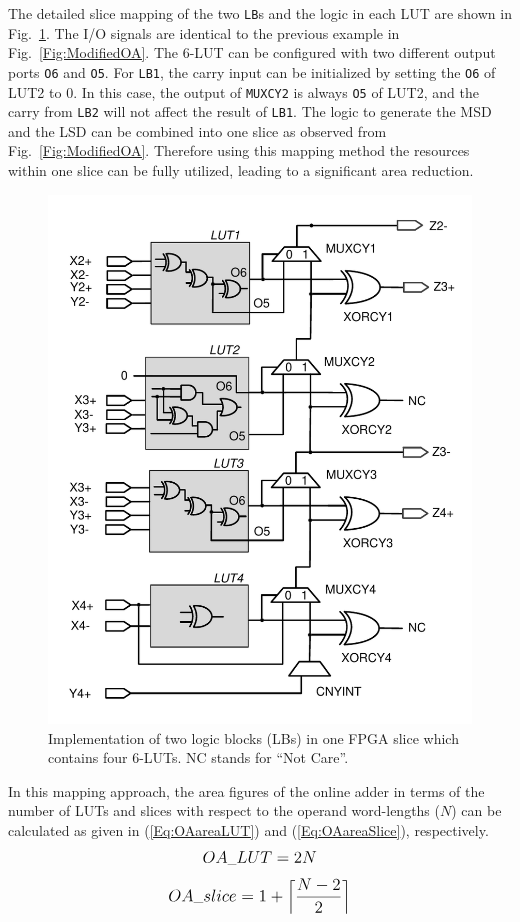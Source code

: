 \documentclass[conference]{IEEEtran}
\begin{document}
The detailed slice mapping of the two \texttt{LB}s and the logic in each LUT are shown in Fig.~\ref{Fig:SliceNew}. The I/O signals are identical to the previous example in Fig.~\ref{Fig:ModifiedOA}. The 6-LUT can be configured with two different output ports \texttt{O6} and \texttt{O5}. For \texttt{LB1}, the carry input can be initialized by setting the \texttt{O6} of LUT2 to 0. In this case, the output of \texttt{MUXCY2} is always \texttt{O5} of LUT2, and the carry from \texttt{LB2} will not affect the result of \texttt{LB1}. The logic to generate the MSD and the LSD can be combined into one slice as observed from Fig.~\ref{Fig:ModifiedOA}. Therefore using this mapping method the resources within one slice can be fully utilized, leading to a significant area reduction.

\begin{figure}[tbp]
	\centering
	\includegraphics[width=.49\textwidth]{./Figures/SDadder_FastCarry_New2.pdf}
	\vspace{-5ex}
	\caption{Implementation of two logic blocks (LBs) in one FPGA slice which contains four 6-LUTs. NC stands for ``Not Care''.}
	\vspace{-2ex}	
	\label{Fig:SliceNew}
\end{figure}

In this mapping approach, the area figures of the online adder in terms of the number of LUTs and slices with respect to the operand word-lengths ($N$) can be calculated as given in (\ref{Eq:OAareaLUT}) and (\ref{Eq:OAareaSlice}), respectively.
%
\begin{eqnarray}\label{Eq:OAareaLUT}
\scriptsize
	OA\_LUT = 2N
\normalsize
\end{eqnarray}
%
\begin{eqnarray}\label{Eq:OAareaSlice}
\footnotesize
	OA\_slice = 1+\left\lceil\frac{N-2}{2}\right\rceil
\normalsize
\end{eqnarray}
\end{document}
